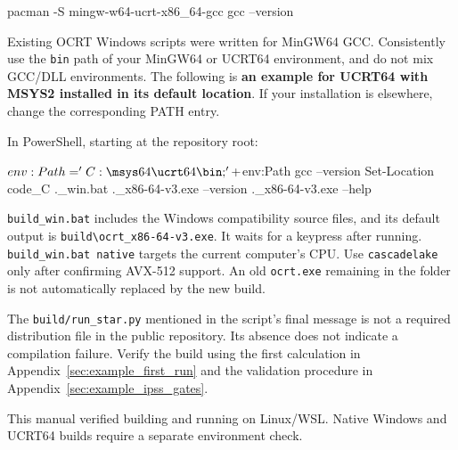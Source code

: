 \par\noindent\begin{minipage}{\linewidth}
\begin{ManualCode}
pacman -S mingw-w64-ucrt-x86_64-gcc
gcc --version
\end{ManualCode}
\end{minipage}\par

Existing OCRT Windows scripts were written for MinGW64 GCC. Consistently use the \texttt{bin} path of your MinGW64 or UCRT64 environment, and do not mix GCC/DLL environments. The following is \textbf{an example for UCRT64 with MSYS2 installed in its default location}. If your installation is elsewhere, change the corresponding PATH entry.

In PowerShell, starting at the repository root:


\par\noindent\begin{minipage}{\linewidth}
\begin{ManualCode}
$env:Path = 'C:\msys64\ucrt64\bin;' + $env:Path
gcc --version
Set-Location code\OCRT_C
.\build_win.bat
.\build\ocrt_x86-64-v3.exe --version
.\build\ocrt_x86-64-v3.exe --help
\end{ManualCode}
\end{minipage}\par

\texttt{build\_\allowbreak{}win.\allowbreak{}bat} includes the Windows compatibility source files, and its default output is \texttt{build\textbackslash{}ocrt\_\allowbreak{}x86-\allowbreak{}64-\allowbreak{}v3.\allowbreak{}exe}. It waits for a keypress after running. \texttt{build\_\allowbreak{}win.\allowbreak{}bat native} targets the current computer's CPU. Use \texttt{cascadelake} only after confirming AVX-512 support. An old \texttt{ocrt.\allowbreak{}exe} remaining in the folder is not automatically replaced by the new build.

The \texttt{build/\allowbreak{}run\_\allowbreak{}star.\allowbreak{}py} mentioned in the script's final message is not a required distribution file in the public repository. Its absence does not indicate a compilation failure. Verify the build using the first calculation in Appendix~\ref{sec:example_first_run} and the validation procedure in Appendix~\ref{sec:example_ipss_gates}.

This manual verified building and running on Linux/WSL. Native Windows and UCRT64 builds require a separate environment check.

